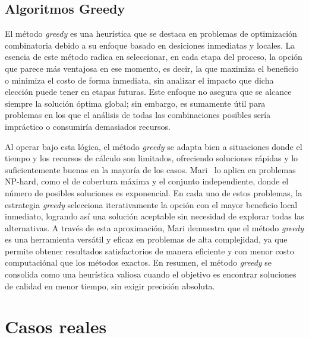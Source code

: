 \documentclass[9pt,a4paper,twoside]{rho-class/rho}
\begin{document}
        \subsection{Algoritmos Greedy}
            El método \textit{greedy} es una heurística que se destaca en problemas de optimización combinatoria debido a su enfoque basado en desiciones inmediatas y locales. La esencia de este método radica en seleccionar, en cada etapa del proceso, la opción que parece más ventajosa en ese momento, es decir, la que maximiza el beneficio o minimiza el costo de forma inmediata, sin analizar el impacto que dicha elección puede tener en etapas futuras. Este enfoque no asegura que se alcance siempre la solución óptima global; sin embargo, es sumamente útil para problemas en los que el análisis de todas las combinaciones posibles sería impráctico o consumiría demasiados recursos.
            \par\medskip
            Al operar bajo esta lógica, el método \textit{greedy} se adapta bien a situaciones donde el tiempo y los recursos de cálculo son limitados, ofreciendo soluciones rápidas y lo suficientemente buenas en la mayoría de los casos. Mari~\cite{Mari2020} lo aplica en problemas NP-hard, como el de cobertura máxima y el conjunto independiente, donde el número de posibles soluciones es exponencial. En cada uno de estos problemas, la estrategia \textit{greedy} selecciona iterativamente la opción con el mayor beneficio local inmediato, logrando así una solución aceptable sin necesidad de explorar todas las alternativas. A través de esta aproximación, Mari demuestra que el método \textit{greedy} es una herramienta versátil y eficaz en problemas de alta complejidad, ya que permite obtener resultados satisfactorios de manera eficiente y con menor costo computaciónal que los métodos exactos. En resumen, el método \textit{greedy} se consolida como una heurística valiosa cuando el objetivo es encontrar soluciones de calidad en menor tiempo, sin exigir precisión absoluta.
    
    \section{Casos reales}
\end{document}
